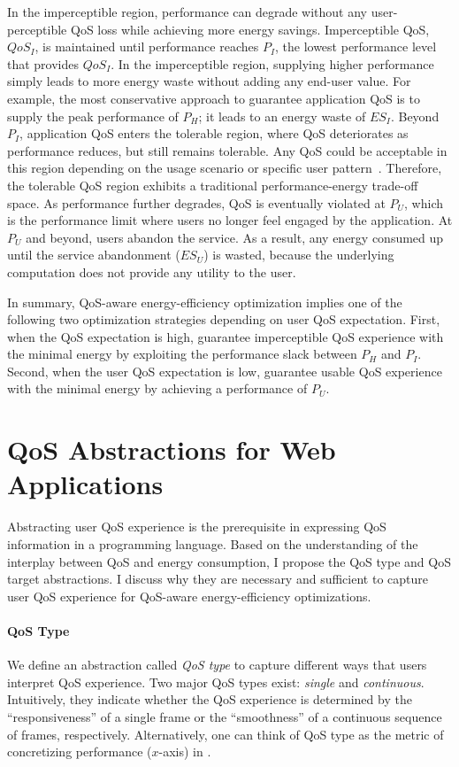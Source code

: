 In the imperceptible region, performance can degrade without any user-perceptible QoS loss while achieving more energy savings. Imperceptible QoS, $QoS_I$, is maintained until performance reaches $P_I$, the lowest performance level that provides $QoS_I$. In the imperceptible region, supplying higher performance simply leads to more energy waste without adding any end-user value. For example, the most conservative approach to guarantee application QoS is to supply the peak performance of $P_H$; it leads to an energy waste of $ES_I$. Beyond $P_I$, application QoS enters the tolerable region, where QoS deteriorates as performance reduces, but still remains tolerable. Any QoS could be acceptable in this region depending on the usage scenario or specific user pattern~\cite{usagepattern,satscore}. Therefore, the tolerable QoS region exhibits a traditional performance-energy trade-off space. As performance further degrades, QoS is eventually violated at $P_U$, which is the performance limit where users no longer feel engaged by the application. At $P_U$ and beyond, users abandon the service. As a result, any energy consumed up until the service abandonment ($ES_U$) is wasted, because the underlying computation does not provide any utility to the user.

In summary, QoS-aware energy-efficiency optimization implies one of the following two optimization strategies depending on user QoS expectation. First, when the QoS expectation is high, guarantee imperceptible QoS experience with the minimal energy by exploiting the performance slack between $P_H$ and $P_I$. Second, when the user QoS expectation is low, guarantee usable QoS experience with the minimal energy by achieving a performance of $P_U$.

\section{QoS Abstractions for Web Applications}
\label{sec:lang:abst}

Abstracting user QoS experience is the prerequisite in expressing QoS information in a programming language. Based on the understanding of the interplay between QoS and energy consumption, I propose the QoS type and QoS target abstractions. I discuss why they are necessary and sufficient to capture user QoS experience for QoS-aware energy-efficiency optimizations.

\paragraph{QoS Type} We define an abstraction called \textit{QoS type} to capture different ways that users interpret QoS experience. Two major QoS types exist: \textit{single} and \textit{continuous}. Intuitively, they indicate whether the QoS experience is determined by the ``responsiveness'' of a single frame or the ``smoothness'' of a continuous sequence of frames, respectively. Alternatively, one can think of QoS type as the metric of concretizing performance ($x$-axis) in .

